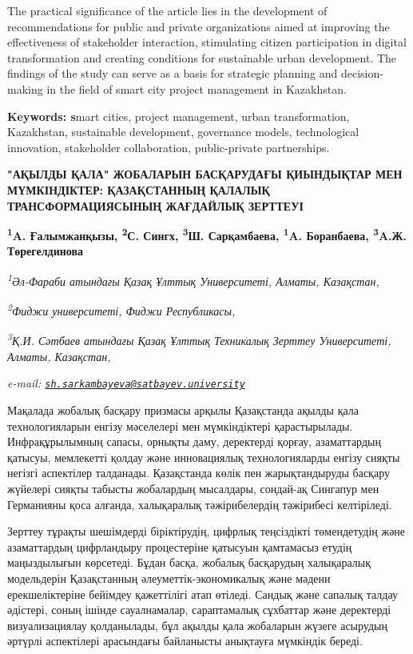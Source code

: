 The practical significance of the article lies in the development of
recommendations for public and private organizations aimed at improving
the effectiveness of stakeholder interaction, stimulating citizen
participation in digital transformation and creating conditions for
sustainable urban development. The findings of the study can serve as a
basis for strategic planning and decision-making in the field of smart
city project management in Kazakhstan.

{\bfseries Keywords: s}mart cities, project management, urban
transformation, Kazakhstan, sustainable development, governance models,
technological innovation, stakeholder collaboration, public-private
partnerships.

\begin{articleheader}
{\bfseries "АҚЫЛДЫ ҚАЛА" ЖОБАЛАРЫН БАСҚАРУДАҒЫ ҚИЫНДЫҚТАР МЕН МҮМКІНДІКТЕР: ҚАЗАҚСТАННЫҢ ҚАЛАЛЫҚ ТРАНСФОРМАЦИЯСЫНЫҢ ЖАҒДАЙЛЫҚ ЗЕРТТЕУІ}

{\bfseries
\textsuperscript{1}A. Ғалымжанқызы,
\textsuperscript{2}С. Сингх,
\textsuperscript{3}Ш. Сарқамбаева\textsuperscript{\envelope },
\textsuperscript{1}A. Боранбаева,
\textsuperscript{3}A.Ж. Төрегелдинова}
\end{articleheader}

\begin{affiliation}
\emph{\textsuperscript{1}Әл-Фараби атындағы Қазақ Ұлттық Университеті, Алматы, Казақстан,}

\emph{\textsuperscript{2}Фиджи университеті, Фиджи Республикасы,}

\emph{\textsuperscript{3}Қ.И. Сәтбаев атындағы Қазақ Ұлттық Техникалық Зерттеу Университеті, Алматы, Казақстан,}

\emph{e-mail: \href{mailto:sh.sarkambayeva@satbayev.university}{\nolinkurl{sh.sarkambayeva@satbayev.university}}}
\end{affiliation}

Мақалада жобалық басқару призмасы арқылы Қазақстанда ақылды қала
технологияларын енгізу мәселелері мен мүмкіндіктері қарастырылады.
Инфрақұрылымның сапасы, орнықты даму, деректерді қорғау, азаматтардың
қатысуы, мемлекетті қолдау және инновациялық технологияларды енгізу
сияқты негізгі аспектілер талданады. Қазақстанда көлік пен
жарықтандыруды басқару жүйелері сияқты табысты жобалардың мысалдары,
сондай-ақ Сингапур мен Германияны қоса алғанда, халықаралық
тәжірибелердің тәжірибесі келтіріледі.

Зерттеу тұрақты шешімдерді біріктірудің, цифрлық теңсіздікті
төмендетудің және азаматтардың цифрландыру процестеріне қатысуын
қамтамасыз етудің маңыздылығын көрсетеді. Бұдан басқа, жобалық
басқарудың халықаралық модельдерін Қазақстанның әлеуметтік-экономикалық
және мәдени ерекшеліктеріне бейімдеу қажеттілігі атап өтіледі. Сандық
және сапалық талдау әдістері, соның ішінде сауалнамалар, сараптамалық
сұхбаттар және деректерді визуализациялау қолданылады, бұл ақылды қала
жобаларын жүзеге асырудың әртүрлі аспектілері арасындағы байланысты
анықтауға мүмкіндік береді.

